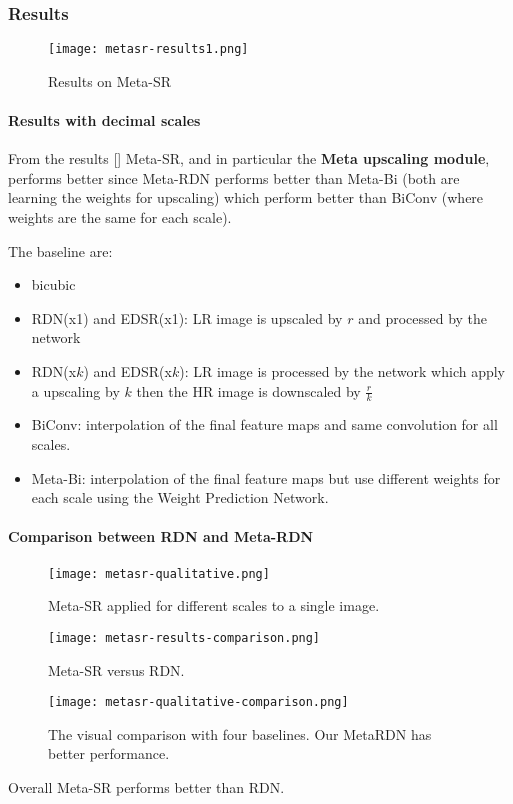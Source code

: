 \subsubsection{Results}

\begin{figure}
    \centering
    \texttt{[image: metasr-results1.png]}
    \caption{Results on Meta-SR}\label{metasr:results}
\end{figure}

\paragraph{Results with decimal scales}
From the results [] Meta-SR, and in particular the \textbf{Meta upscaling module}, performs better since Meta-RDN performs better than Meta-Bi (both are learning the weights for upscaling) which perform better than BiConv (where weights are the same for each scale).

The baseline are:
\begin{itemize}
    \item bicubic
    \item RDN(x1) and EDSR(x1): LR image is upscaled by $r$ and processed by the network
    \item RDN(x$k$) and EDSR(x$k$): LR image is processed by the network which apply a upscaling by $k$ then the HR image is downscaled by $\frac{r}{k}$
    \item BiConv: interpolation of the final feature maps and same convolution for all scales.
    \item Meta-Bi: interpolation of the final feature maps but use different weights for each scale using the Weight Prediction Network. 
\end{itemize}

\paragraph{Comparison between RDN and Meta-RDN}
\begin{figure}
    \centering
    \texttt{[image: metasr-qualitative.png]}
    \caption{Meta-SR applied for different scales to a single image.}
\end{figure}

\begin{figure}
    \centering
    \texttt{[image: metasr-results-comparison.png]}
    \caption{Meta-SR versus RDN.}
\end{figure}

\begin{figure}
    \centering
    \texttt{[image: metasr-qualitative-comparison.png]}
    \caption{The visual comparison with four baselines. Our MetaRDN has better performance.}
\end{figure}

Overall Meta-SR performs better than RDN.